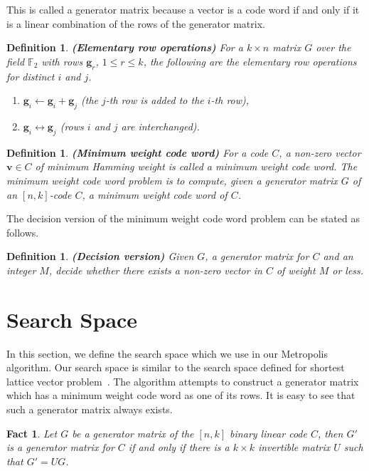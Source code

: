 \documentclass{sig-alternate-2013}
\newtheorem{fact}[theorem]{Fact}
\newtheorem{definition}[theorem]{Definition}
\begin{document}
This is called a generator matrix because a vector is a code word if
and only if it is a linear combination of the rows of the generator
matrix.

\begin{definition}\textbf{(Elementary row operations)}
  \label{elementary-operation}
  For a $k\times n$ matrix $G$ over the field $\mathbb{F}_2$ with rows
  $\mathbf{g}_r$, $1 \leq r \leq k$, the following are the elementary
  row operations for distinct $i$ and $j$.
  \begin{enumerate}
  \item $\mathbf{g}_i \leftarrow \mathbf{g}_i + \mathbf{g}_j$ (the
    $j$-th row is added to the $i$-th row),
  \item $\mathbf{g}_i \leftrightarrow \mathbf{g}_j$ (rows $i$ and $j$
    are interchanged).
\end{enumerate}
\end {definition}

\begin{definition}{\bf (Minimum weight code word)}
  For a code $C$, a non-zero vector $\mathbf{v} \in C$ of minimum
  Hamming weight is called a minimum weight code word. The
  \emph{minimum weight code word} problem is to compute, given a
  generator matrix $G$ of an $[n,k]$-code $C$, a minimum weight code
  word of $C$.
\end{definition} 

The decision version of the minimum weight code word problem can be
stated as follows.

\begin{definition}\textbf{(Decision version)}
  Given $G$, a generator matrix for $C$ and an integer $M$,
  \emph{decide} whether there exists a non-zero vector in $C$ of
  weight $M$ or less.
\end{definition}  

\section{Search Space}

In this section, we define the search space which we use in our
Metropolis algorithm. Our search space is similar to the search space
defined for shortest lattice vector problem~\cite{ajith, ajith-j}.
The algorithm attempts to construct a generator matrix which has a
minimum weight code word as one of its rows. It is easy to see that
such a generator matrix always exists.

\begin{fact}\cite{linear-algebra}
  Let $G$ be a generator matrix of the $[n,k]$ binary linear code $C$,
  then $G'$ is a generator matrix for $C$ if and only if there is a
  $k\times k$ invertible matrix $U$ such that $G' = UG$.
\end{fact}
\end{document}
